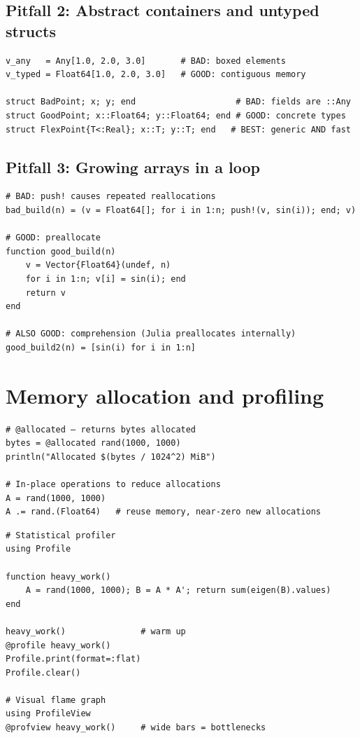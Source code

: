\subsection{Pitfall 2: Abstract containers and untyped structs}

\begin{verbatim}
v_any   = Any[1.0, 2.0, 3.0]       # BAD: boxed elements
v_typed = Float64[1.0, 2.0, 3.0]   # GOOD: contiguous memory

struct BadPoint; x; y; end                    # BAD: fields are ::Any
struct GoodPoint; x::Float64; y::Float64; end # GOOD: concrete types
struct FlexPoint{T<:Real}; x::T; y::T; end   # BEST: generic AND fast
\end{verbatim}

\subsection{Pitfall 3: Growing arrays in a loop}

\begin{verbatim}
# BAD: push! causes repeated reallocations
bad_build(n) = (v = Float64[]; for i in 1:n; push!(v, sin(i)); end; v)

# GOOD: preallocate
function good_build(n)
    v = Vector{Float64}(undef, n)
    for i in 1:n; v[i] = sin(i); end
    return v
end

# ALSO GOOD: comprehension (Julia preallocates internally)
good_build2(n) = [sin(i) for i in 1:n]
\end{verbatim}

\section{Memory allocation and profiling}

\begin{verbatim}
# @allocated — returns bytes allocated
bytes = @allocated rand(1000, 1000)
println("Allocated $(bytes / 1024^2) MiB")

# In-place operations to reduce allocations
A = rand(1000, 1000)
A .= rand.(Float64)   # reuse memory, near-zero new allocations
\end{verbatim}

\begin{verbatim}
# Statistical profiler
using Profile

function heavy_work()
    A = rand(1000, 1000); B = A * A'; return sum(eigen(B).values)
end

heavy_work()               # warm up
@profile heavy_work()
Profile.print(format=:flat)
Profile.clear()

# Visual flame graph
using ProfileView
@profview heavy_work()     # wide bars = bottlenecks
\end{verbatim}

